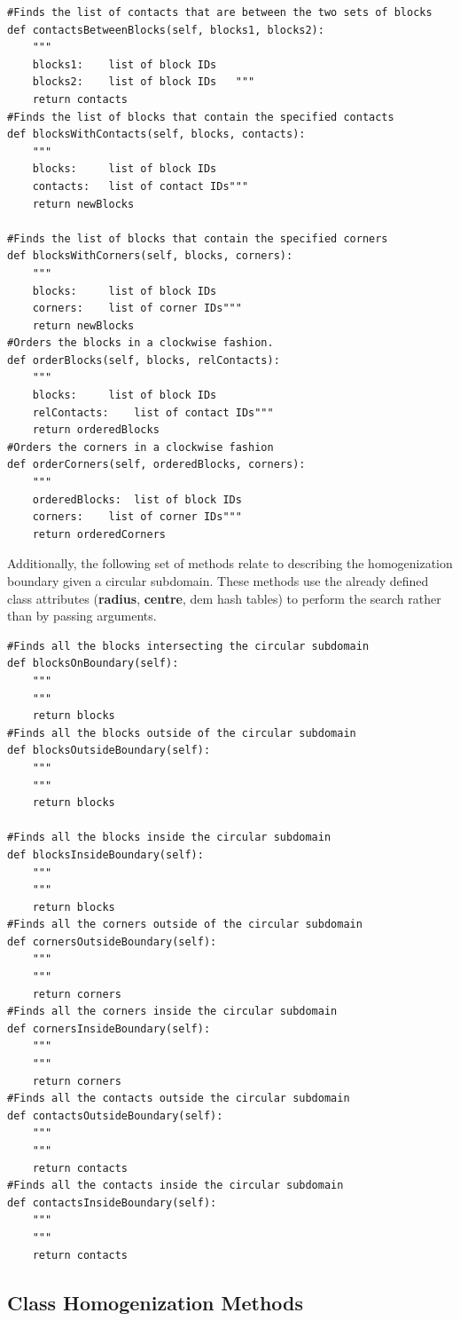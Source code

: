 \begin{lstlisting}[frame=single] 
#Finds the list of contacts that are between the two sets of blocks
def contactsBetweenBlocks(self, blocks1, blocks2):
	"""
	blocks1:	list of block IDs
	blocks2: 	list of block IDs	"""
	return contacts
#Finds the list of blocks that contain the specified contacts
def blocksWithContacts(self, blocks, contacts):
	"""
	blocks:		list of block IDs
	contacts:	list of contact IDs"""
	return newBlocks
	
#Finds the list of blocks that contain the specified corners
def blocksWithCorners(self, blocks, corners):
	"""
	blocks:		list of block IDs
	corners:	list of corner IDs"""
	return newBlocks
#Orders the blocks in a clockwise fashion.
def orderBlocks(self, blocks, relContacts):
	"""
	blocks:		list of block IDs
	relContacts:	list of contact IDs"""
	return orderedBlocks
#Orders the corners in a clockwise fashion
def orderCorners(self, orderedBlocks, corners):
	"""
	orderedBlocks:	list of block IDs
	corners:	list of corner IDs"""
	return orderedCorners
\end{lstlisting}
	
Additionally, the following set of methods relate to describing the homogenization boundary given a circular subdomain. These methods use the already defined class attributes (\textbf{radius}, \textbf{centre}, \acrshort{dem} hash tables) to perform the search rather than by passing arguments.

\begin{lstlisting}[frame=single] 
#Finds all the blocks intersecting the circular subdomain
def blocksOnBoundary(self):
	"""
	"""
	return blocks
#Finds all the blocks outside of the circular subdomain
def blocksOutsideBoundary(self):
	"""
	"""
	return blocks
	
#Finds all the blocks inside the circular subdomain
def blocksInsideBoundary(self):
	"""
	"""
	return blocks
#Finds all the corners outside of the circular subdomain	
def cornersOutsideBoundary(self):
	"""
	"""
	return corners
#Finds all the corners inside the circular subdomain
def cornersInsideBoundary(self):
	"""
	"""
	return corners
#Finds all the contacts outside the circular subdomain
def contactsOutsideBoundary(self):
	"""
	"""
	return contacts
#Finds all the contacts inside the circular subdomain
def contactsInsideBoundary(self):
	"""
	"""
	return contacts
\end{lstlisting}

\subsection{Class Homogenization Methods}

